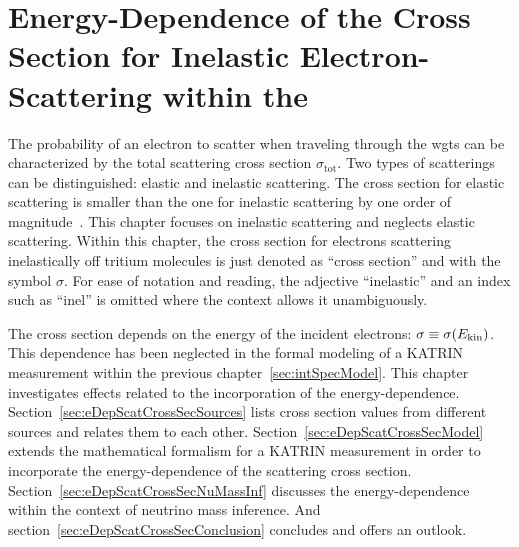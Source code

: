 \def\currentRootFolder{chapter/energyDependentCrossSec}
\def\currentFigureFolder{\currentRootFolder/fig}


\chapter{Energy-Dependence of the Cross Section for Inelastic Electron-Scattering within the }
\label{sec:eDepScatCrossSec}
The probability of an electron to scatter when traveling through the \gls{wgts} can be characterized by the total scattering cross section $\sigma_\mathrm{tot}$. Two types of scatterings can be distinguished: elastic and inelastic scattering. The cross section for elastic scattering is smaller than the one for inelastic scattering by one order of magnitude~\cite{Kleesiek2019}. This chapter focuses on inelastic scattering and neglects elastic scattering. Within this chapter, the cross section for electrons scattering inelastically off tritium molecules is just denoted as ``cross section'' and with the symbol $\sigma$. For ease of notation and reading, the adjective ``inelastic'' and an index such as ``inel'' is omitted where the context allows it unambiguously.

The cross section depends on the energy of the incident electrons: $\sigma \equiv \sigma(E_\mathrm{kin})$. This dependence has been neglected in the formal modeling of a KATRIN measurement within the previous chapter~\ref{sec:intSpecModel}. This chapter investigates effects related to the incorporation of the energy-dependence. Section~\ref{sec:eDepScatCrossSecSources} lists cross section values from different sources and relates them to each other. Section~\ref{sec:eDepScatCrossSecModel} extends the mathematical formalism for a KATRIN measurement in order to incorporate the energy-dependence of the scattering cross section. Section~\ref{sec:eDepScatCrossSecNuMassInf} discusses the energy-dependence within the context of neutrino mass inference. And section~\ref{sec:eDepScatCrossSecConclusion} concludes and offers an outlook.


